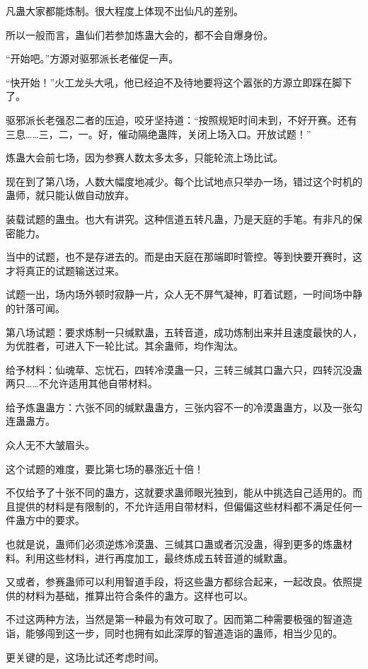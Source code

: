\begin{this_body}
凡蛊大家都能炼制。很大程度上体现不出仙凡的差别。

所以一般而言，蛊仙们若参加炼蛊大会的，都不会自爆身份。

“开始吧。”方源对驱邪派长老催促一声。

“快开始！”火工龙头大吼，他已经迫不及待地要将这个嚣张的方源立即踩在脚下了。

驱邪派长老强忍二者的压迫，咬牙坚持道：“按照规矩时间未到，不好开赛。还有三息……三，二，一。好，催动隔绝蛊阵，关闭上场入口。开放试题！”

炼蛊大会前七场，因为参赛人数太多太多，只能轮流上场比试。

现在到了第八场，人数大幅度地减少。每个比试地点只举办一场，错过这个时机的蛊师，就只能认做自动放弃。

装载试题的蛊虫。也大有讲究。这种信道五转凡蛊，乃是天庭的手笔。有非凡的保密能力。

当中的试题，也不是存进去的。而是由天庭在那端即时管控。等到快要开赛时，这才将真正的试题输送过来。

试题一出，场内场外顿时寂静一片，众人无不屏气凝神，盯着试题，一时间场中静的针落可闻。

第八场试题：要求炼制一只缄默蛊，五转音道，成功炼制出来并且速度最快的人，为优胜者，可进入下一轮比试。其余蛊师，均作淘汰。

给予材料：仙魂草、忘忧石，四转冷漠蛊一只，三转三缄其口蛊六只，四转沉没蛊两只……不允许适用其他自带材料。

给予炼蛊蛊方：六张不同的缄默蛊蛊方，三张内容不一的冷漠蛊蛊方，以及一张勾连蛊蛊方。

众人无不大皱眉头。

这个试题的难度，要比第七场的暴涨近十倍！

不仅给予了十张不同的蛊方，这就要求蛊师眼光独到，能从中挑选自己适用的。而且提供的材料是有限制的，不允许适用自带材料，但偏偏这些材料都不满足任何一件蛊方中的要求。

也就是说，蛊师们必须逆炼冷漠蛊、三缄其口蛊或者沉没蛊，得到更多的炼蛊材料。利用这些材料，进行再度加工，最终炼成五转音道的缄默蛊。

又或者，参赛蛊师可以利用智道手段，将这些蛊方都综合起来，一起改良。依照提供的材料为基础，推算出符合条件的蛊方。这样也可以。

不过这两种方法，当然是第一种最为有效可取了。因而第二种需要极强的智道造诣，能够闯到这一步，同时也拥有如此深厚的智道造诣的蛊师，相当少见的。

更关键的是，这场比试还考虑时间。


\end{this_body}
